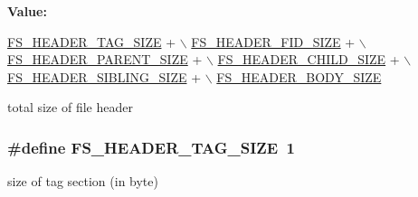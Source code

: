 {\bfseries Value\-:}
\begin{DoxyCode}
\hyperlink{group__fs__header_ga499f64a7727690bf0d5281e16539a95a}{FS\_HEADER\_TAG\_SIZE} + \hyperlink{group__fs__header_ga9ebf8374931fc290233a3fd175a1593c}{\(\backslash\)}
\hyperlink{group__fs__header_ga9ebf8374931fc290233a3fd175a1593c}{                           FS\_HEADER\_FID\_SIZE} + 
      \hyperlink{group__fs__header_gae31c4ce686bea764e72c6ba0f49ed672}{\(\backslash\)}
\hyperlink{group__fs__header_gae31c4ce686bea764e72c6ba0f49ed672}{                           FS\_HEADER\_PARENT\_SIZE} + 
      \hyperlink{group__fs__header_gaa8acbe7b4b0c8c5e9213afa90b528142}{\(\backslash\)}
\hyperlink{group__fs__header_gaa8acbe7b4b0c8c5e9213afa90b528142}{                           FS\_HEADER\_CHILD\_SIZE} + 
      \hyperlink{group__fs__header_ga7e470e354b3fa15e3880ecdb8784c6a2}{\(\backslash\)}
\hyperlink{group__fs__header_ga7e470e354b3fa15e3880ecdb8784c6a2}{                           FS\_HEADER\_SIBLING\_SIZE} + 
      \hyperlink{group__fs__header_ga4aecac06373354147de5dfec4ba14ca9}{\(\backslash\)}
\hyperlink{group__fs__header_ga4aecac06373354147de5dfec4ba14ca9}{                           FS\_HEADER\_BODY\_SIZE}
\end{DoxyCode}
total size of file header \hypertarget{group__fs__header_ga499f64a7727690bf0d5281e16539a95a}{
\subsubsection[{F\-S\-\_\-\-H\-E\-A\-D\-E\-R\-\_\-\-T\-A\-G\-\_\-\-S\-I\-Z\-E}]{\setlength{\rightskip}{0pt plus 5cm}\#define F\-S\-\_\-\-H\-E\-A\-D\-E\-R\-\_\-\-T\-A\-G\-\_\-\-S\-I\-Z\-E~1}}\label{group__fs__header_ga499f64a7727690bf0d5281e16539a95a}
size of tag section (in byte) 